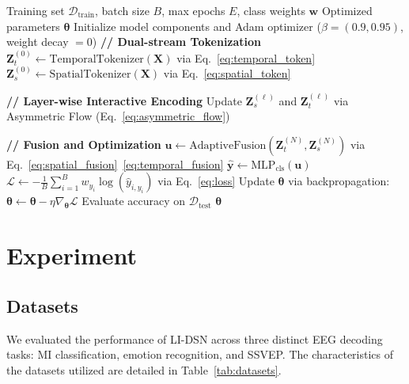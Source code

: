 \documentclass[journal]{IEEEtran}
\theoremstyle{plain}
\begin{document}
\begin{algorithm}[t]
\caption{Training Procedure of LI-DSN}
\label{alg:training}
\begin{algorithmic}[1]
\REQUIRE Training set $\mathcal{D}_{\text{train}}$, batch size $B$, max epochs $E$, class weights $\mathbf{w}$
\ENSURE Optimized parameters $\boldsymbol{\theta}$
\STATE Initialize model components and Adam optimizer ($\beta=(0.9, 0.95)$, weight decay $=0$)
        \STATE \textbf{// Dual-stream Tokenization}
        \STATE $\mathbf{Z}_t^{(0)} \leftarrow \text{TemporalTokenizer}(\mathbf{X})$ via Eq.~\eqref{eq:temporal_token}
        \STATE $\mathbf{Z}_s^{(0)} \leftarrow \text{SpatialTokenizer}(\mathbf{X})$ via Eq.~\eqref{eq:spatial_token}
        
        \STATE \textbf{// Layer-wise Interactive Encoding}
            \STATE Update $\mathbf{Z}_s^{(\ell)}$ and $\mathbf{Z}_t^{(\ell)}$ via Asymmetric Flow (Eq.~\eqref{eq:asymmetric_flow})
        \ENDFOR
        
        \STATE \textbf{// Fusion and Optimization}
        \STATE $\mathbf{u} \leftarrow \text{AdaptiveFusion}(\mathbf{Z}_t^{(N)}, \mathbf{Z}_s^{(N)})$ via Eq.~\eqref{eq:spatial_fusion}~\eqref{eq:temporal_fusion}
        \STATE $\hat{\mathbf{y}} \leftarrow \text{MLP}_{\text{cls}}(\mathbf{u})$
        \STATE $\mathcal{L} \leftarrow -\frac{1}{B}\sum_{i=1}^{B} w_{y_i} \log(\hat{y}_{i,y_i})$ via Eq.~\eqref{eq:loss}
        \STATE Update $\boldsymbol{\theta}$ via backpropagation: $\boldsymbol{\theta} \leftarrow \boldsymbol{\theta} - \eta \nabla_{\boldsymbol{\theta}} \mathcal{L}$
    \ENDFOR
    \STATE Evaluate accuracy on $\mathcal{D}_{\text{test}}$
\ENDFOR
\RETURN $\boldsymbol{\theta}$
\end{algorithmic}
\end{algorithm}

\section{Experiment}
\subsection{Datasets}
We evaluated the performance of LI-DSN across three distinct EEG decoding tasks: MI classification, emotion recognition, and SSVEP. The characteristics of the datasets utilized are detailed in Table~\ref{tab:datasets}.
\end{document}
